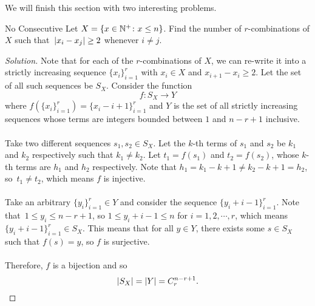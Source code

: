 \documentclass[math]{amznotes}
\theoremstyle{remark}
\newenvironment{solution}
    {\let\oldqedsymbol=\qedsymbol
    \renewcommand{\qedsymbol}{\ }
    \begin{proof}[Solution]
    }
    {\end{proof}
    \renewcommand{\qedsymbol}{\oldqedsymbol}
    }
\begin{document}
We will finish this section with two interesting problems.
\begin{exbox}{No Consecutive}{}
    Let $X = \left\{x \in \mathbb{N}^+ \colon x \leq n\right\}$. Find the number of $r$-combinations of $X$ such that~${\left\lvert {x_i - x_j} \right\rvert} \geq 2$ whenever $i \neq j$.
    \tcblower   
    \begin{solution}
        Note that for each of the $r$-combinations of $X$, we can re-write it into a strictly increasing sequence $\{x_i\}_{i = 1}^r$ with $x_i \in X$ and $x_{i + 1} - x_i \geq 2$. Let the set of all such sequences be $S_X$. Consider the function
        \begin{displaymath}
            f \colon S_X \to Y
        \end{displaymath}
        where $f\left(\{x_i\}_{i = 1}^r\right) = \{x_i - i + 1\}_{i = 1}^r$ and $Y$ is the set of all strictly increasing sequences whose terms are integers bounded between $1$ and $n - r + 1$ inclusive.
        \\\\
        Take two different sequences $s_1, s_2 \in S_X$. Let the $k$-th terms of $s_1$ and $s_2$ be $k_1$ and $k_2$ respectively such that $k_1 \neq k_2$. Let $t_1 = f(s_1)$ and $t_2 = f(s_2)$, whose $k$-th terms are $h_1$ and $h_2$ respectively. Note that $h_1 = k_1 - k + 1 \neq k_2 - k + 1 = h_2$, so~$t_1 \neq t_2$, which means $f$ is injective.
        \\\\
        Take an arbitrary $\{y_i\}_{i = 1}^r \in Y$ and consider the sequence $\{y_i + i - 1\}_{i = 1}^r$. Note that~$1 \leq y_i \leq n - r + 1$, so $1 \leq y_i + i - 1 \leq n$ for $i = 1, 2, \cdots, r$, which means~$\{y_i + i - 1\}_{i = 1}^r \in S_X$. This means that for all $y \in Y$, there exists some $s \in S_X$ such that $f(s) = y$, so $f$ is surjective.
        \\\\
        Therefore, $f$ is a bijection and so
        \begin{equation*}
            {\left\lvert {S_X} \right\rvert} = {\left\lvert {Y} \right\rvert} = C^{n - r + 1}_r.
        \end{equation*}
    \end{solution}
\end{exbox}
\end{document}
